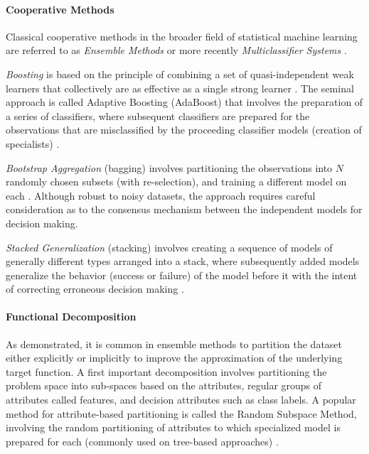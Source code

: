 \paragraph{Cooperative Methods}
Classical cooperative methods in the broader field of statistical machine learning are referred to as \emph{Ensemble Methods} \cite{Opitz1999, Polikar2006} or more recently \emph{Multiclassifier Systems} \cite{Ghosh2002}. 

\emph{Boosting} is based on the principle of combining a set of quasi-independent weak learners that collectively are as effective as a single strong learner \cite{Kearns1988, Schapire1992}. The seminal approach is called Adaptive Boosting (AdaBoost) that involves the preparation of a series of classifiers, where subsequent classifiers are prepared for the observations that are misclassified by the proceeding classifier models (creation of specialists) \cite{Schapire2003}. 

\emph{Bootstrap Aggregation} (bagging) involves partitioning the observations into $N$ randomly chosen subsets (with re-selection), and training a different model on each \cite{Breiman1996}. Although robust to noisy datasets, the approach requires careful consideration as to the consensus mechanism between the independent models for decision making. 

\emph{Stacked Generalization} (stacking) involves creating a sequence of models of generally different types arranged into a stack, where subsequently added models generalize the behavior (success or failure) of the model before it with the intent of correcting erroneous decision making \cite{Wolpert1992, Ting1999}. 
	
\paragraph{Functional Decomposition}
As demonstrated, it is common in ensemble methods to partition the dataset either explicitly or implicitly to improve the approximation of the underlying target function. A first important decomposition involves partitioning the problem space into sub-spaces based on the attributes, regular groups of attributes called features, and decision attributes such as class labels. A popular method for attribute-based partitioning is called the Random Subspace Method, involving the random partitioning of attributes to which specialized model is prepared for each (commonly used on tree-based approaches) \cite{Ho1998}. 


